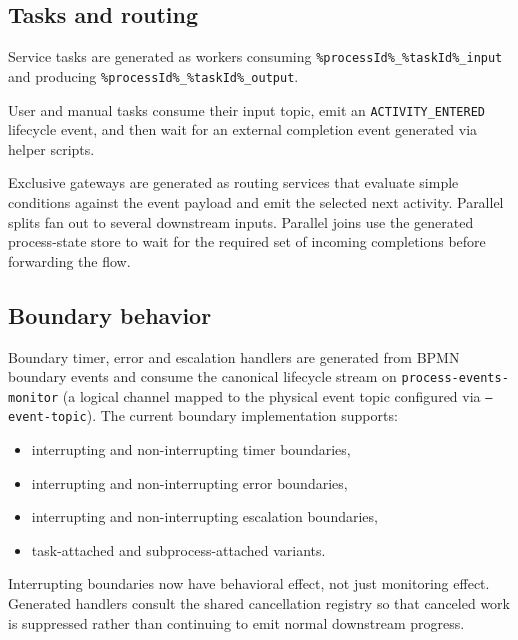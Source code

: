 \subsection{Tasks and routing}

Service tasks are generated as workers consuming \texttt{\%processId\%\_\%taskId\%\_input} and producing \texttt{\%processId\%\_\%taskId\%\_output}.

User and manual tasks consume their input topic, emit an \texttt{ACTIVITY\_ENTERED} lifecycle event, and then wait for an external completion event generated via helper scripts.

Exclusive gateways are generated as routing services that evaluate simple conditions against the event payload and emit the selected next activity. Parallel splits fan out to several downstream inputs. Parallel joins use the generated process-state store to wait for the required set of incoming completions before forwarding the flow.

\subsection{Boundary behavior}

Boundary timer, error and escalation handlers are generated from BPMN boundary events and consume the canonical lifecycle stream on \texttt{process-events-monitor} (a logical channel mapped to the physical event topic configured via \texttt{--event-topic}). The current boundary implementation supports:
\begin{itemize}
\item interrupting and non-interrupting timer boundaries,
\item interrupting and non-interrupting error boundaries,
\item interrupting and non-interrupting escalation boundaries,
\item task-attached and subprocess-attached variants.
\end{itemize}

Interrupting boundaries now have behavioral effect, not just monitoring effect. Generated handlers consult the shared cancellation registry so that canceled work is suppressed rather than continuing to emit normal downstream progress.

